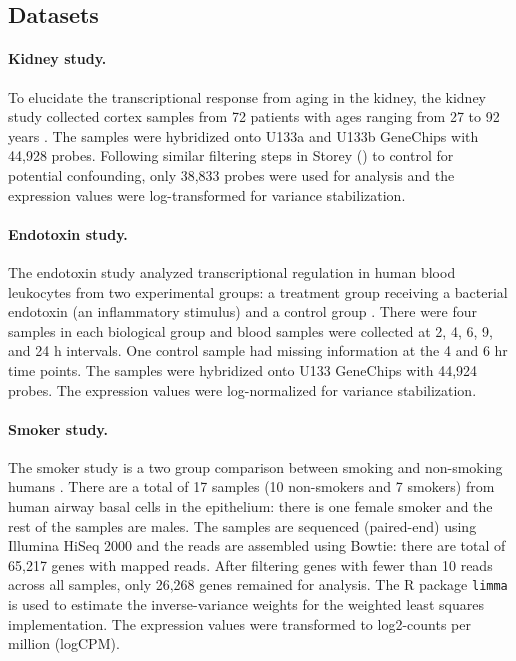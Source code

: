 \documentclass[11pt]{article}
\begin{document}
\subsection{Datasets}

\paragraph{Kidney study.} To elucidate the transcriptional response from aging in the kidney, the kidney study collected cortex samples from 72 patients with ages ranging from 27 to 92 years \citep{rodwell2004}. The samples were hybridized onto U133a and U133b GeneChips with 44,928 probes. Following similar filtering steps in Storey (\citeyear{Storey_2005_time}) to control for potential confounding, only 38,833 probes were used for analysis and the expression values were log-transformed for variance stabilization.

\paragraph{Endotoxin study.} The endotoxin study analyzed transcriptional regulation in human blood leukocytes from two experimental groups: a treatment group receiving a bacterial endotoxin (an inflammatory stimulus) and a control group \citep{calvano2005}. There were four samples in each biological group and blood samples were collected at 2, 4, 6, 9, and 24 h intervals. One control sample had missing information at the 4 and 6 hr time points. The samples were hybridized onto U133 GeneChips with 44,924 probes. The expression values were log-normalized for variance stabilization.

\paragraph{Smoker study.} The smoker study is a two group comparison between smoking and non-smoking humans \citep{ryan2014}. There are a total of 17 samples (10 non-smokers and 7 smokers) from human airway basal cells in the epithelium: there is one female smoker and the rest of the samples are males. The samples are sequenced (paired-end) using Illumina HiSeq 2000 and the reads are assembled using Bowtie: there are total of 65,217 genes with mapped reads. After filtering genes with fewer than 10 reads across all samples, only 26,268 genes remained for analysis. The R package \texttt{limma} is used to estimate the inverse-variance weights for the weighted least squares implementation. The expression values were transformed to log2-counts per million (logCPM).
\end{document}
